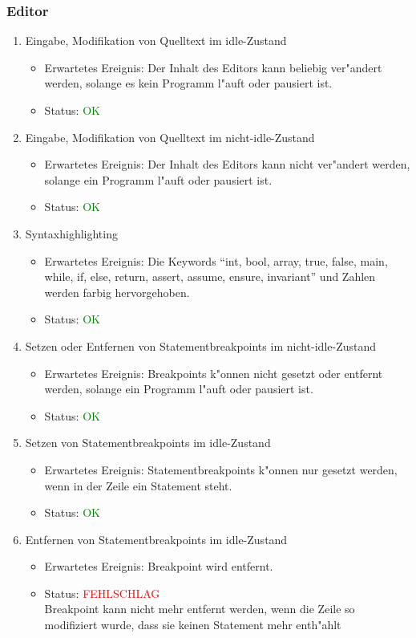 \subsubsection{Editor}
\begin{enumerate}
\item Eingabe, Modifikation von Quelltext im idle-Zustand
\begin{itemize}
\item Erwartetes Ereignis: Der Inhalt des Editors kann beliebig ver"andert werden, solange es kein Programm l"auft oder pausiert ist. 
\item Status: \textcolor{green}{OK}
\end{itemize}
\item Eingabe, Modifikation von Quelltext im nicht-idle-Zustand
\begin{itemize}
\item Erwartetes Ereignis: Der Inhalt des Editors kann nicht ver"andert werden, solange ein Programm l"auft oder pausiert ist. 
\item Status: \textcolor{green}{OK}
\end{itemize}
\item Syntaxhighlighting
\begin{itemize}
\item Erwartetes Ereignis: Die Keywords "`int, bool, array, true, false, main, while, if, else, return, assert, assume, ensure, invariant"' und Zahlen werden farbig hervorgehoben. 
\item Status: \textcolor{green}{OK}
\end{itemize}
\item Setzen oder Entfernen von Statementbreakpoints im nicht-idle-Zustand
\begin{itemize}
\item Erwartetes Ereignis: Breakpoints k"onnen nicht gesetzt oder entfernt werden, solange ein Programm l"auft oder pausiert ist. 
\item Status: \textcolor{green}{OK}
\end{itemize}
\item Setzen von Statementbreakpoints im idle-Zustand
\begin{itemize}
\item Erwartetes Ereignis: Statementbreakpoints k"onnen nur gesetzt werden, wenn in der Zeile ein Statement steht.
\item Status: \textcolor{green}{OK}
\end{itemize}
\item Entfernen von Statementbreakpoints im idle-Zustand
\begin{itemize}
\item Erwartetes Ereignis: Breakpoint wird entfernt.
\item Status: \textcolor{red}{FEHLSCHLAG} \\
Breakpoint kann nicht mehr entfernt werden, wenn die Zeile so modifiziert wurde, dass sie keinen Statement mehr enth"ahlt
\end{itemize}
\end{enumerate}
